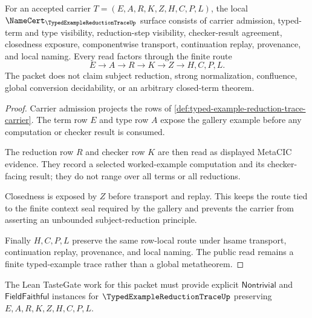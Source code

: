 \begin{theorem}
\label{thm:typed-example-reduction-trace-namecert-obligations}
For an accepted carrier $T=(E,A,R,K,Z,H,C,P,L)$, the local $\NameCert_{\TypedExampleReductionTraceUp}$ surface consists of carrier admission, typed-term and type visibility, reduction-step visibility, checker-result agreement, closedness exposure, componentwise transport, continuation replay, provenance, and local naming. Every read factors through the finite route
$$
E \to A \to R \to K \to Z \to H,C,P,L .
$$
The packet does not claim subject reduction, strong normalization, confluence, global conversion decidability, or an arbitrary closed-term theorem.
\end{theorem}
\begin{proof}
Carrier admission projects the rows of \autoref{def:typed-example-reduction-trace-carrier}. The term row $E$ and type row $A$ expose the gallery example before any computation or checker result is consumed.

The reduction row $R$ and checker row $K$ are then read as displayed MetaCIC evidence. They record a selected worked-example computation and its checker-facing result; they do not range over all terms or all reductions.

Closedness is exposed by $Z$ before transport and replay. This keeps the route tied to the finite context seal required by the gallery and prevents the carrier from asserting an unbounded subject-reduction principle.

Finally $H,C,P,L$ preserve the same row-local route under hsame transport, continuation replay, provenance, and local naming. The public read remains a finite typed-example trace rather than a global metatheorem.
\end{proof}



The Lean TasteGate work for this packet must provide explicit $\mathsf{Nontrivial}$ and $\mathsf{FieldFaithful}$ instances for $\TypedExampleReductionTraceUp$ preserving $E,A,R,K,Z,H,C,P,L$.

